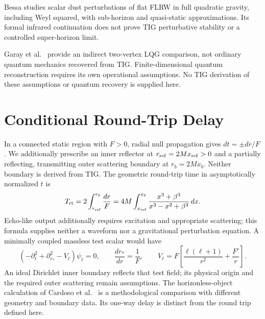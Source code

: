 \documentclass[11pt,final]{article}
\begin{document}
Bessa \cite{bessa2026matterdensityquadratic} studies scalar dust perturbations
of flat FLRW in full quadratic gravity, including Weyl squared, with
sub-horizon and quasi-static approximations. Its formal infrared continuation
does not prove TIG perturbative stability or a controlled super-horizon limit.

Garay et al.\ \cite{garay2026globalvariablesemergentcosmology} provide an
indirect two-vertex LQG comparison, not ordinary quantum mechanics recovered
from TIG. Finite-dimensional quantum reconstruction
\cite{chiribella2011} requires its own operational assumptions.
No TIG derivation of these assumptions or quantum recovery is supplied here.

\section{Conditional Round-Trip Delay}

In a connected static region with $F>0$, radial null propagation gives
$dt=\pm dr/F$. We additionally prescribe an inner reflector at
$r_{\rm ref}=2Mx_{\rm ref}>0$ and a partially reflecting, transmitting outer
scattering boundary at $r_b=2Mx_b$. Neither boundary is derived from TIG.
The geometric round-trip time in asymptotically normalized $t$ is
\begin{equation}
T_{\rm rt}=2\int_{r_{\rm ref}}^{r_b}\frac{dr}{F}
=4M\int_{x_{\rm ref}}^{x_b}\frac{x^3+\beta^3}{x^3-x^2+\beta^3}\,dx.
\label{eq:roundtrip}
\end{equation}
Echo-like output additionally requires excitation and appropriate scattering;
this formula supplies neither a waveform nor a gravitational perturbation
equation. A minimally coupled massless test scalar would have
\begin{equation}
(-\partial_t^2+\partial_{r_*}^2-V_\ell)\psi_\ell=0,\qquad
\frac{dr_*}{dr}=\frac1F,\qquad
V_\ell=F\left[\frac{\ell(\ell+1)}{r^2}+\frac{F'}r\right].
\end{equation}
An ideal Dirichlet inner boundary reflects that test field; its physical
origin and the required outer scattering remain assumptions.
The horizonless-object calculation of Cardoso et al.\ \cite{cardoso2016}
is a methodological comparison with different geometry and boundary data.
Its one-way delay is distinct from the round trip defined here.
\end{document}
